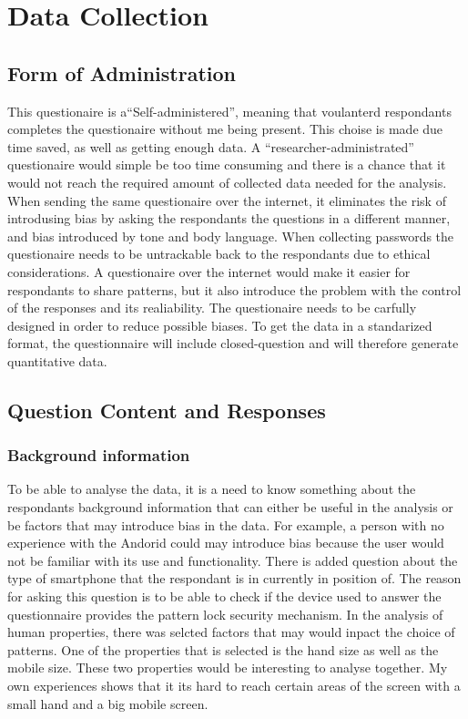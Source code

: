 \section{Data Collection}

  \subsection{Form of Administration}

    This questionaire is a``Self-administered'', meaning that voulanterd respondants completes the questionaire without me being present. This choise is made due time saved, as well as getting enough data. A ``researcher-administrated'' questionaire would simple be too time consuming and there is a chance that it would not reach the required amount of collected data needed for the analysis. When sending the same questionaire over the internet, it eliminates the risk of introdusing bias by asking the respondants the questions in a different manner, and bias introduced by tone and body language. When collecting passwords the questionaire needs to be untrackable back to the respondants due to ethical considerations. A questionaire over the internet would make it easier for respondants to share patterns, but it also introduce the problem with the control of the responses and its realiability. The questionaire needs to be carfully designed in order to reduce possible biases. To get the data in a standarized format, the questionnaire will include closed-question and will therefore generate quantitative data. 

  \subsection{Question Content and Responses}

    \subsubsection*{Background information}
    To be able to analyse the data, it is a need to know something about the respondants background information that can either be useful in the analysis or be factors that may introduce bias in the data. For example, a person with no experience with the Andorid could may introduce bias because the user would not be familiar with its use and functionality. There is added question about the type of smartphone that the respondant is in currently in position of. The reason for asking this question is to be able to  check if the device used to answer the questionnaire provides the pattern lock security mechanism. In the analysis of human properties, there was selcted factors that may would inpact the choice of patterns. One of the properties that is selected is the hand size as well as the mobile size. These two properties would be interesting to analyse together. My own experiences shows that it its hard to reach certain areas of the screen with a small hand and a big mobile screen. \\

